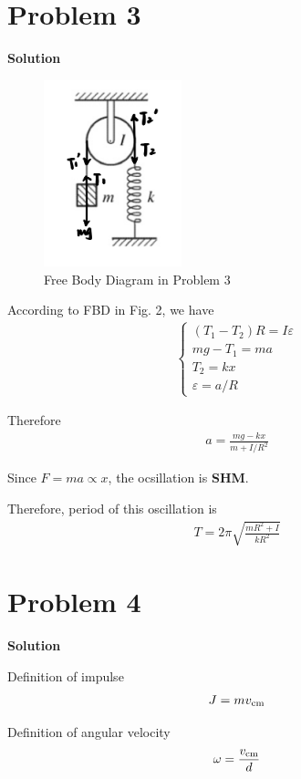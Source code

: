 \documentclass[12pt,a4paper]{article}
\begin{document}
\section*{\large \textbf{Problem 3}}
{\textbf{Solution}}

\begin{figure}
\includegraphics[width=4cm]{FDR2.png}
\caption{Free Body Diagram in Problem 3}
\end{figure}

According to FBD in Fig. 2, we have
\begin{align}
	\left\{
		\begin{array}{l}
			(T_1-T_2) R = I\varepsilon\\
			mg-T_1 = ma\\
			T_2 = kx\\
			\varepsilon = a/R
		\end{array}
	\right.
\end{align}

Therefore
\begin{align}
	a = \frac{mg-kx}{m+I/R^2}
\end{align}

Since $F=ma \propto x$, the ocsillation is \textbf{SHM}.

Therefore, period of this oscillation is
\begin{align}
	T = 2\pi\sqrt{\frac{mR^2 + I}{kR^2}}
\end{align}



\section*{\large \textbf{Problem 4}}
{\textbf{Solution}}

Definition of impulse
\begin{align}
	J = mv_{\rm cm}
\end{align}

Definition of angular velocity
\begin{align}
	\omega = \frac{v_{\rm cm}}{d}
\end{align}
\end{document}
